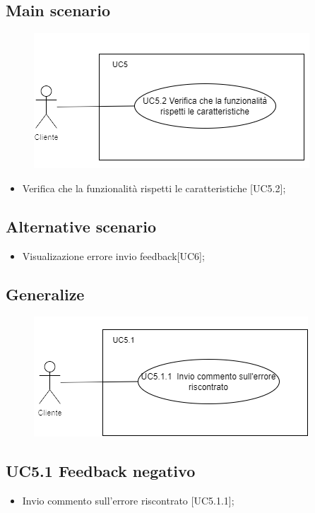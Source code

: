 \documentclass{article}
\begin{document}
    \subsection*{Main scenario}
        \begin{figure}[h]
            \centering
            \includegraphics{documenti/imgUML/UC5-zoom.png}
            \label{fig:immagine}
        \end{figure}
        \begin{itemize}
            \item Verifica che la funzionalità rispetti le caratteristiche [UC5.2];
        \end{itemize}
        
    \subsection*{Alternative scenario}
    \begin{itemize}
        \item Visualizazione errore invio feedback[UC6];
    \end{itemize}

    \subsection*{Generalize}
    \begin{figure}[h]
            \centering
            \includegraphics{documenti/imgUML/UC5-zoom1.png}
            \label{fig:immagine}
        \end{figure}
    \subsection{UC5.1 Feedback negativo}
    \begin{itemize}
            \item Invio commento sull'errore riscontrato [UC5.1.1];
        \end{itemize}
        
\end{document}

